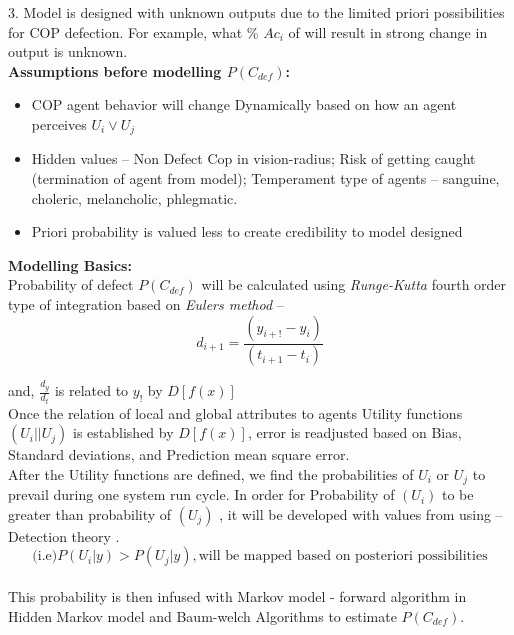 \documentclass[a4paper,11pt]{article}
\begin{document}
3. Model is designed with unknown outputs due to the limited priori possibilities for COP defection. For example, what \% $Ac_i$ of  will result in strong change in output is unknown.\\ %
\textbf{Assumptions before modelling $P(C_{def})$:} 
\begin{itemize}
    \item COP agent behavior will change Dynamically based on how an agent perceives $U_i \lor U_j$ 
    \item Hidden values – Non Defect Cop in vision-radius; Risk of getting caught (termination of agent from model); Temperament type of agents – sanguine, choleric, melancholic, phlegmatic. 
    \item Priori probability is valued less to create credibility to model designed 
\end{itemize}
\textbf{Modelling Basics: }\\
Probability of defect $P(C_{def})$ will be calculated using \textit{Runge-Kutta} fourth order type of integration based on \textit{Eulers method} \cite{KAELBLING199899} – \\
	\[d_{i+1} = \frac{(y_{i+!} - y_i)}{(t_{i+1} - t_i)}\]

and, 	    $\frac{d_y}{d_t}$ is related to  $y_!$ by $D[f(x)]$ \\

Once the relation of local and global attributes to agents Utility functions $(U_i || U_j)$ is established by $D[f(x)]$, error is readjusted based on Bias, Standard deviations, and Prediction mean square error. \cite{MMD} \\
After the Utility functions are defined, we find the probabilities of $U_i$ or $U_j$ to prevail during one system run cycle. In order for Probability of $(U_i)$ to be greater than probability of $(U_j)$ , it will be developed with values from using – Detection theory \cite{ORLEAN1995257}. \\
   \[(\text{i.e)} P(U_i | y) > P(U_j | y), \text{will be mapped based on posteriori possibilities} \] \\
This probability is then infused with Markov model \cite{KAELBLING199899}  - forward algorithm in Hidden Markov model and Baum-welch Algorithms to estimate $P(C_{def})$. \\
\end{document}
